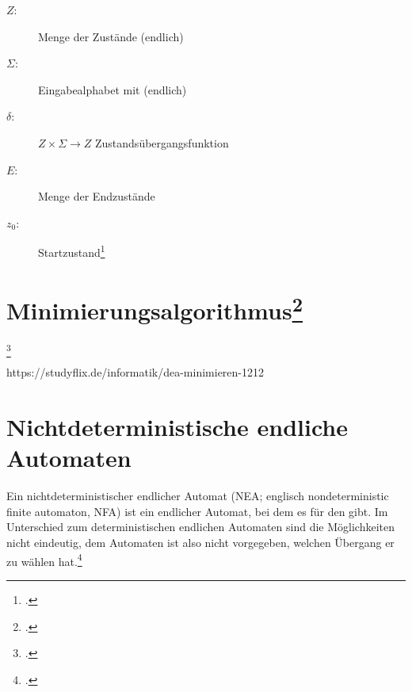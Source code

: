 \documentclass{lehramt-informatik-haupt}
\begin{document}
\begin{description}
\item[$Z$:] Menge der Zustände (endlich)
\item[$\Sigma$:] Eingabealphabet mit (endlich)
\item[$\delta$:] $Z \times \Sigma \rightarrow Z$ Zustandsübergangsfunktion
\item[$E$:] Menge der Endzustände
\item[$z_0$:] Startzustand\footcite[Seite 26]{theoinf:fs:1}
\end{description}

%

\section{Minimierungsalgorithmus\footcite[Seite 47-57]{vossen}}

\footcite[Seite 51-62]{theoinf:fs:1}

https://studyflix.de/informatik/dea-minimieren-1212

%

\section{Nichtdeterministische endliche Automaten}

Ein nichtdeterministischer endlicher Automat (NEA; englisch
nondeterministic finite automaton, NFA) ist ein endlicher Automat, bei
dem es für den  gibt. Im Unterschied zum deterministischen endlichen
Automaten sind die Möglichkeiten nicht eindeutig, dem Automaten ist also
nicht vorgegeben, welchen Übergang er zu wählen hat.\footcite{wiki:nea}

\begin{center}
\end{center}
\end{document}
